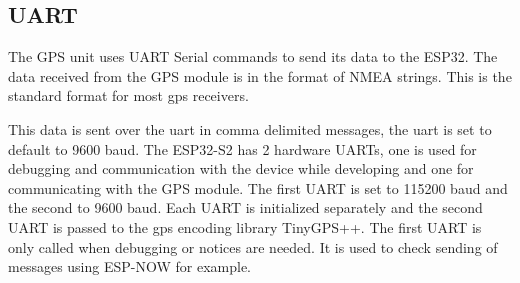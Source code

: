 \subsection{UART}
The GPS unit uses UART Serial commands to send its data to the ESP32. The data received from the GPS module is in the format of NMEA strings. This is the standard format for most gps receivers.\cite{NMEA}
\begin{table}[!htb]
	\label{tab:nmea}
	\caption{NMEA Sentences and their meanings \cite{GPSSentence}}
\end{table}

\noindent
This data is sent over the uart in comma delimited messages, the uart is set to default to 9600 baud.
The ESP32-S2 has 2 hardware UARTs, one is used for debugging and communication with the device while developing and one for communicating with the GPS module. The first UART is set to 115200 baud and the second to 9600 baud. Each UART is initialized separately and the second UART is passed to the gps encoding library TinyGPS++. The first UART is only called when debugging or notices are needed. It is used to check sending of messages using ESP-NOW for example.


